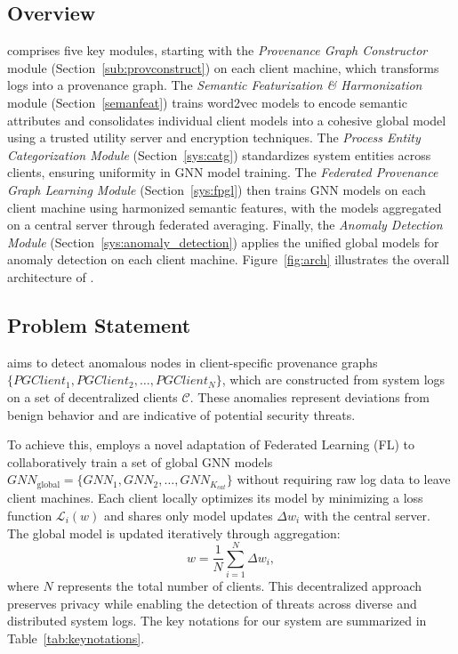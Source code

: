 \subsection{Overview}
\Sys comprises five key modules, starting with the \textit{Provenance Graph Constructor} module (Section~\ref{sub:provconstruct}) on each client machine, which transforms logs into a provenance graph. The \textit{Semantic Featurization \& Harmonization} module (Section~\ref{semanfeat}) trains word2vec models to encode semantic attributes and consolidates individual client models into a cohesive global model using a trusted utility server and encryption techniques. The \textit{Process Entity Categorization Module} (Section~\ref{sys:catg}) standardizes system entities across clients, ensuring uniformity in GNN model training. The \textit{Federated Provenance Graph Learning Module} (Section~\ref{sys:fpgl}) then trains GNN models on each client machine using harmonized semantic features, with the models aggregated on a central server through federated averaging. Finally, the \textit{Anomaly Detection Module} (Section~\ref{sys:anomaly_detection}) applies the unified global models for anomaly detection on each client machine. Figure~\ref{fig:arch} illustrates the overall architecture of \Sys.

\subsection{Problem Statement}

\Sys aims to detect anomalous nodes in client-specific provenance graphs \( \{PGClient_{1}, PGClient_{2}, \ldots, PGClient_{N}\} \), which are constructed from system logs on a set of decentralized clients \( \mathcal{C} \). These anomalies represent deviations from benign behavior and are indicative of potential security threats.

To achieve this, \Sys employs a novel adaptation of Federated Learning (FL) to collaboratively train a set of global GNN models \( {GNN}_{\text{global}} = \{GNN_1, GNN_2, \ldots, GNN_{K_{cat}}\} \) without requiring raw log data to leave client machines. Each client locally optimizes its model by minimizing a loss function \( \mathcal{L}_i(w) \) and shares only model updates \( \Delta w_i \) with the central server. The global model is updated iteratively through aggregation:
\[
w = \frac{1}{N} \sum_{i=1}^{N} \Delta w_i,
\]
where \( N \) represents the total number of clients. This decentralized approach preserves privacy while enabling the detection of threats across diverse and distributed system logs. The key notations for our system are summarized in Table~\ref{tab:keynotations}.



